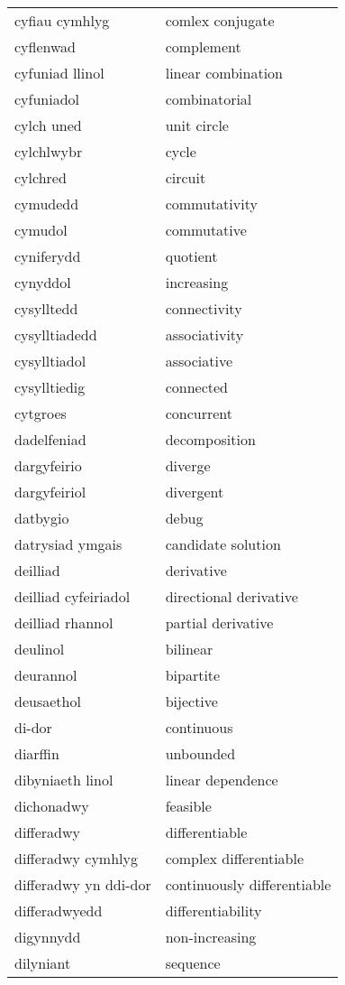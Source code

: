 \begin{supertabular}{p{0.22\textwidth}p{0.22\textwidth}}
cyfiau cymhlyg & comlex conjugate \\
cyflenwad & complement \\
cyfuniad llinol & linear combination \\
cyfuniadol & combinatorial \\
cylch uned & unit circle \\
cylchlwybr & cycle \\
cylchred & circuit \\
cymudedd & commutativity \\
cymudol & commutative \\
cyniferydd & quotient \\
cynyddol & increasing \\
cysylltedd & connectivity \\
cysylltiadedd & associativity \\
cysylltiadol & associative \\
cysylltiedig & connected \\
cytgroes & concurrent \\
dadelfeniad & decomposition \\
dargyfeirio & diverge \\
dargyfeiriol & divergent \\
datbygio & debug \\
datrysiad ymgais & candidate solution \\
deilliad & derivative \\
deilliad cyfeiriadol & directional derivative \\
deilliad rhannol & partial derivative \\
deulinol & bilinear \\
deurannol & bipartite \\
deusaethol & bijective \\
di-dor & continuous \\
diarffin & unbounded \\
dibyniaeth linol & linear dependence \\
dichonadwy & feasible \\
differadwy & differentiable \\
differadwy cymhlyg & complex differentiable \\
differadwy yn ddi-dor & continuously differentiable \\
differadwyedd & differentiability \\
digynnydd & non-increasing \\
dilyniant & sequence \\

\end{supertabular}
